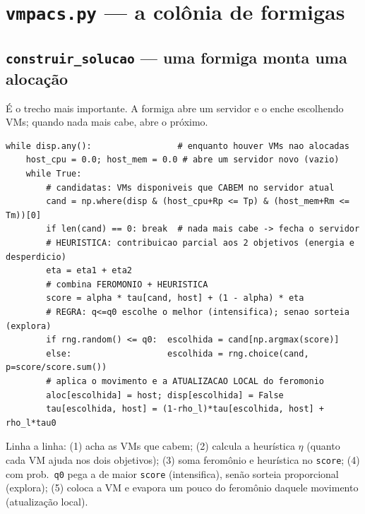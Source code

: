 \documentclass[11pt]{article}
\begin{document}
\section{\texttt{vmpacs.py} --- a colônia de formigas}
\subsection{\texttt{construir\_solucao} --- uma formiga monta uma alocação}
É o trecho mais importante. A formiga abre um servidor e o enche escolhendo VMs;
quando nada mais cabe, abre o próximo.
\begin{lstlisting}
while disp.any():                 # enquanto houver VMs nao alocadas
    host_cpu = 0.0; host_mem = 0.0 # abre um servidor novo (vazio)
    while True:
        # candidatas: VMs disponiveis que CABEM no servidor atual
        cand = np.where(disp & (host_cpu+Rp <= Tp) & (host_mem+Rm <= Tm))[0]
        if len(cand) == 0: break  # nada mais cabe -> fecha o servidor
        # HEURISTICA: contribuicao parcial aos 2 objetivos (energia e desperdicio)
        eta = eta1 + eta2
        # combina FEROMONIO + HEURISTICA
        score = alpha * tau[cand, host] + (1 - alpha) * eta
        # REGRA: q<=q0 escolhe o melhor (intensifica); senao sorteia (explora)
        if rng.random() <= q0:  escolhida = cand[np.argmax(score)]
        else:                   escolhida = rng.choice(cand, p=score/score.sum())
        # aplica o movimento e a ATUALIZACAO LOCAL do feromonio
        aloc[escolhida] = host; disp[escolhida] = False
        tau[escolhida, host] = (1-rho_l)*tau[escolhida, host] + rho_l*tau0
\end{lstlisting}
\begin{ideia}
Linha a linha: (1) acha as VMs que cabem; (2) calcula a heurística $\eta$ (quanto
cada VM ajuda nos dois objetivos); (3) soma feromônio e heurística no
\texttt{score}; (4) com prob.\ \texttt{q0} pega a de maior \texttt{score}
(intensifica), senão sorteia proporcional (explora); (5) coloca a VM e evapora um
pouco do feromônio daquele movimento (atualização local).
\end{ideia}
\end{document}
